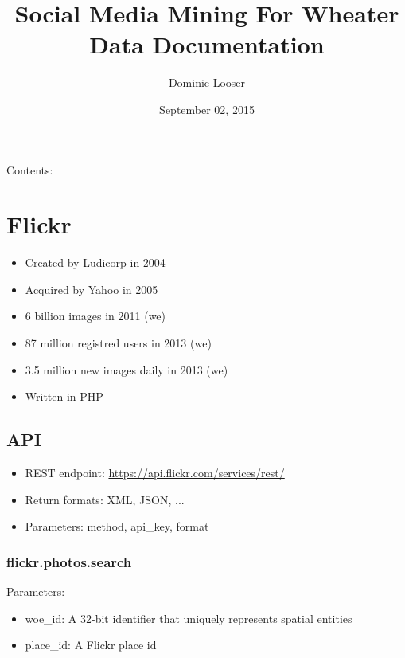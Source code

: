 \documentclass[letterpaper,10pt,english]{sphinxmanual}
\title{Social Media Mining For Wheater Data Documentation}
\date{September 02, 2015}
\author{Dominic Looser}
\begin{document}
\maketitle
\tableofcontents
{}\label{index::doc}


Contents:


\chapter{Flickr}
\label{flickr:flickr}\label{flickr::doc}\label{flickr:social-media-mining-for-wheater-data}\begin{itemize}
\item {} 
Created by Ludicorp in 2004

\item {} 
Acquired by Yahoo in 2005

\item {} 
6 billion images in 2011 (we)

\item {} 
87 million registred users in 2013 (we)

\item {} 
3.5 million new images daily in 2013 (we)

\item {} 
Written in PHP

\end{itemize}


\section{API}
\label{flickr:api}\begin{itemize}
\item {} 
REST endpoint: \href{https://api.flickr.com/services/rest/}{https://api.flickr.com/services/rest/}

\item {} 
Return formats: XML, JSON, ...

\item {} 
Parameters: method, api\_key, format

\end{itemize}


\subsection{flickr.photos.search}
\label{flickr:flickr-photos-search}
Parameters:
\begin{itemize}
\item {} 
woe\_id: A 32-bit identifier that uniquely represents spatial entities

\item {} 
place\_id: A Flickr place id

\end{itemize}
\end{document}

